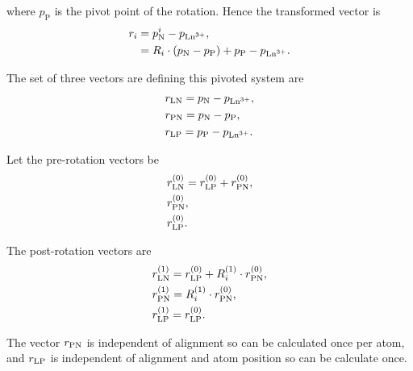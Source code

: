 where $p_{\textrm{P}}$ is the pivot point of the rotation.
Hence the transformed vector is
\begin{subequations}
\begin{align}
    r_i &= p_{\textrm{N}}^i - p_{\textrm{Ln}^{3+}} , \\
             &= R_i \cdot \left( p_{\textrm{N}} - p_{\textrm{P}} \right) + p_{\textrm{P}} - p_{\textrm{Ln}^{3+}} . \label{eq: pivoted rotation vector i}
\end{align}
\end{subequations}

The set of three vectors are defining this pivoted system are
\begin{subequations}
\begin{align}
    & r_{\textrm{LN}} = p_{\textrm{N}} - p_{\textrm{Ln}^{3+}} , \\
    & r_{\textrm{PN}} = p_{\textrm{N}} - p_{\textrm{P}} , \\
    & r_{\textrm{LP}} = p_{\textrm{P}} - p_{\textrm{Ln}^{3+}} .
\end{align}
\end{subequations}

Let the pre-rotation vectors be
\begin{subequations}
\begin{align}
    & r_{\textrm{LN}}^{(0)} = r_{\textrm{LP}}^{(0)} + r_{\textrm{P} \textrm{N}}^{(0)} , \\
    & r_{\textrm{PN}}^{(0)} , \\
    & r_{\textrm{LP}}^{(0)} .
\end{align}
\end{subequations}

The post-rotation vectors are
\begin{subequations}
\begin{align}
    & r_{\textrm{LN}}^{(1)} = r_{\textrm{LP}}^{(0)} + R_i^{(1)} \cdot r_{\textrm{P} \textrm{N}}^{(0)} , \\
    & r_{\textrm{PN}}^{(1)} = R_i^{(1)} \cdot r_{\textrm{P} \textrm{N}}^{(0)}, \\
    & r_{\textrm{LP}}^{(1)} = r_{\textrm{LP}}^{(0)}.
\end{align}
\end{subequations}

The vector $r_{\textrm{PN}}$ is independent of alignment so can be calculated once per atom, and $r_{\textrm{LP}}$ is independent of alignment and atom position so can be calculate once.




